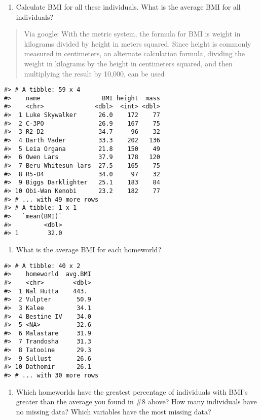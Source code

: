 \documentclass[
]{book}
\providecommand{\tightlist}{%
  \setlength{\itemsep}{0pt}\setlength{\parskip}{0pt}}
\begin{document}
\begin{enumerate}
\def\labelenumi{\arabic{enumi}.}
\setcounter{enumi}{6}
\tightlist
\item
  Calculate BMI for all these individuals. What is the average BMI for all individuals?
\end{enumerate}

\begin{quote}
Via google: With the metric system, the formula for BMI is weight in kilograms divided by height in meters squared. Since height is commonly measured in centimeters, an alternate calculation formula, dividing the weight in kilograms by the height in centimeters squared, and then multiplying the result by 10,000, can be used
\end{quote}

\begin{verbatim}
#> # A tibble: 59 x 4
#>    name                 BMI height  mass
#>    <chr>              <dbl>  <int> <dbl>
#>  1 Luke Skywalker      26.0    172    77
#>  2 C-3PO               26.9    167    75
#>  3 R2-D2               34.7     96    32
#>  4 Darth Vader         33.3    202   136
#>  5 Leia Organa         21.8    150    49
#>  6 Owen Lars           37.9    178   120
#>  7 Beru Whitesun lars  27.5    165    75
#>  8 R5-D4               34.0     97    32
#>  9 Biggs Darklighter   25.1    183    84
#> 10 Obi-Wan Kenobi      23.2    182    77
#> # ... with 49 more rows
#> # A tibble: 1 x 1
#>   `mean(BMI)`
#>         <dbl>
#> 1        32.0
\end{verbatim}

\begin{enumerate}
\def\labelenumi{\arabic{enumi}.}
\setcounter{enumi}{7}
\tightlist
\item
  What is the average BMI for each homeworld?
\end{enumerate}

\begin{verbatim}
#> # A tibble: 40 x 2
#>    homeworld  avg.BMI
#>    <chr>        <dbl>
#>  1 Nal Hutta    443. 
#>  2 Vulpter       50.9
#>  3 Kalee         34.1
#>  4 Bestine IV    34.0
#>  5 <NA>          32.6
#>  6 Malastare     31.9
#>  7 Trandosha     31.3
#>  8 Tatooine      29.3
#>  9 Sullust       26.6
#> 10 Dathomir      26.1
#> # ... with 30 more rows
\end{verbatim}

\begin{enumerate}
\def\labelenumi{\arabic{enumi}.}
\setcounter{enumi}{8}
\tightlist
\item
  Which homeworlds have the greatest percentage of individuals with BMI's greater than the average you found in \#8 above?
  How many individuals have no missing data? Which variables have the most missing data?
\end{enumerate}
\end{document}
